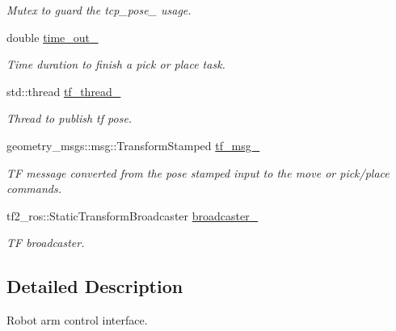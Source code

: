 \begin{DoxyCompactItemize}
\begin{DoxyCompactList}\small\item\em Mutex to guard the tcp\+\_\+pose\+\_\+ usage. \end{DoxyCompactList}\item 
\mbox{\label{classArmControlBase_ab21a9f771990d5b4c88a95040473ce39}} 
double \hyperlink{classArmControlBase_ab21a9f771990d5b4c88a95040473ce39}{time\+\_\+out\+\_\+}
\begin{DoxyCompactList}\small\item\em Time duration to finish a pick or place task. \end{DoxyCompactList}\item 
\mbox{\label{classArmControlBase_a31f7693c570cdb64b5c2534ca0a0413e}} 
std\+::thread \hyperlink{classArmControlBase_a31f7693c570cdb64b5c2534ca0a0413e}{tf\+\_\+thread\+\_\+}
\begin{DoxyCompactList}\small\item\em Thread to publish tf pose. \end{DoxyCompactList}\item 
\mbox{\label{classArmControlBase_af8ca0c0155b34197923554470172f858}} 
geometry\+\_\+msgs\+::msg\+::\+Transform\+Stamped \hyperlink{classArmControlBase_af8ca0c0155b34197923554470172f858}{tf\+\_\+msg\+\_\+}
\begin{DoxyCompactList}\small\item\em TF message converted from the pose stamped input to the move or pick/place commands. \end{DoxyCompactList}\item 
\mbox{\label{classArmControlBase_a1b16ae75e1410202c4add9b229f546c4}} 
tf2\+\_\+ros\+::\+Static\+Transform\+Broadcaster \hyperlink{classArmControlBase_a1b16ae75e1410202c4add9b229f546c4}{broadcaster\+\_\+}
\begin{DoxyCompactList}\small\item\em TF broadcaster. \end{DoxyCompactList}\end{DoxyCompactItemize}


\subsection{Detailed Description}
Robot arm control interface. 

